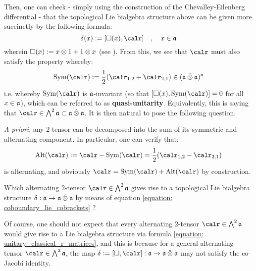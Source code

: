 
\begin{definition} \label{def: coboundary_topological_lie_bialgebras}
    
\end{definition}
\begin{remark} \label{remark: classical_r_matrices_non_uniqueness}
    
\end{remark}
Then, one can check - simply using the construction of the Chevalley-Eilenberg differential - that the topological Lie bialgebra structure above can be given more succinctly by the following formula:
    \begin{equation} \label{equation: coboundary_lie_cobrackets}
        \delta(x) := [\Box(x), \calr] \quad, \quad x \in \a
    \end{equation}
wherein $\Box(x) := x \tensor 1 + 1 \tensor x$ (see \cite[Section 3.2]{etingof_schiffmann_lectures_on_quantum_groups}). From this, we see that $\calr$ must also satisfy the property whereby:
    \begin{equation} \label{equation: quasi_unitary_classical_r_matrices}
        \Sym(\calr) := \frac12( \calr_{1, 2} + \calr_{2, 1} ) \in (\a \hattensor \a)^{\a}
    \end{equation}
i.e. whereby $\Sym(\calr)$ is $\mathfrak{a}$-invariant (so that $[\Box(x), \Sym(\calr)] = 0$ for all $x \in \mathfrak{a}$), which can be referred to as \textbf{quasi-unitarity}. Equivalently, this is saying that $\calr \in \bigwedge^2 \a \subset \a \hattensor \a$. It is then natural to pose the following question.
\begin{remark}
    \textit{A priori}, any $2$-tensor can be decomposed into the sum of its symmetric and alternating component. In particular, one can verify that:
        $$\Alt(\calr) := \calr - \Sym(\calr) = \frac12(\calr_{1, 2} - \calr_{2, 1})$$
    is alternating, and obviously $\calr = \Sym(\calr) + \Alt(\calr)$ by construction.
\end{remark}
\begin{question}
    Which alternating $2$-tensor $\calr \in \bigwedge^2 \a$ gives rise to a topological Lie bialgebra structure $\delta: \a \to \a \hattensor \a$ by means of equation \eqref{equation: coboundary_lie_cobrackets} ?
\end{question}
Of course, one should not expect that every alternating $2$-tensor $\calr \in \bigwedge^2 \a$ would give rise to a Lie bialgebra structure via formula \eqref{equation: unitary_classical_r_matrices}, and this is because for a general alternating tensor $\calr \in \bigwedge^2 \a$, the map $\delta := [\Box, \calr]: \a \to \a \hattensor \a$ may not satisfy the co-Jacobi identity.

